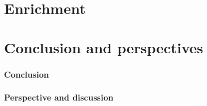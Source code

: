 \documentclass[8pt,usenames,dvipsnames]{beamer}
\begin{document}
\section{Enrichment}

\begin{frame}
\frametitle{}
\end{frame}




\section{Conclusion and perspectives}
\begin{frame}
\frametitle{Conclusion}

\end{frame}

\begin{frame}
\frametitle{Perspective and discussion}
\end{frame}
\end{document}
